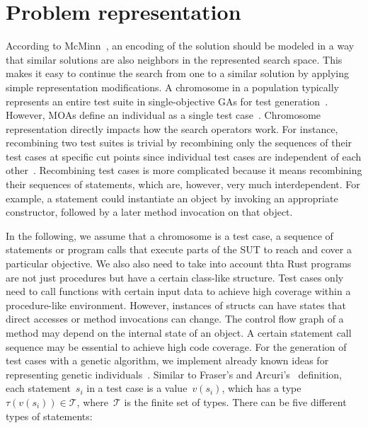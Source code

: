 \documentclass[paper=a4,%
  twoside,%
  BCOR4mm,%
  abstract=true,%
  toc=bibliography,%
  chapterprefix=true,%
  toc=bibliographynumbered,%
  open=right,%
  english,%
  pagesize=pdftex]{scrreprt}
\begin{document}
\section{Problem representation}
\label{sec:problem-representation}
According to McMinn~\cite{McMinn_2004}, an encoding of the solution should be modeled in a way that similar solutions are also neighbors in the represented search space. This makes it easy to continue the search from one to a similar solution by applying simple representation modifications. A chromosome in a population typically represents an entire test suite in single-objective \acp{GA} for test generation~\cite{Fraser_2011a, Campos2017}. However, \acp{MOA} define an individual as a single test case~\cite{Panichella2018}. Chromosome representation directly impacts how the search operators work. For instance, recombining two test suites is trivial by recombining only the sequences of their test cases at specific cut points since individual test cases are independent of each other~\cite{Fraser_2013}. Recombining test cases is more complicated because it means recombining their sequences of statements, which are, however, very much interdependent. For example, a statement could instantiate an object by invoking an appropriate constructor, followed by a later method invocation on that object. 

In the following, we assume that a chromosome is a test case, a sequence of statements or program calls that execute parts of the \ac{SUT} to reach and cover a particular objective. We also also need to take into account thta Rust programs are not just procedures but have a certain class-like structure. Test cases only need to call functions with certain input data to achieve high coverage within a procedure-like environment. However, instances of structs can have states that direct accesses or method invocations can change. The control flow graph of a method may depend on the internal state of an object. A certain statement call sequence may be essential to achieve high code coverage. For the generation of test cases with a genetic algorithm, we implement already known ideas for representing genetic individuals~\cite{Fraser2012,Tonella2004,Arcuri2008}. Similar to Fraser's and Arcuri's~\cite{Fraser_2011a} definition, each statement~$s_i$ in a test case is a value~$v(s_i)$, which has a type~$\tau(v(s_i)) \in \mathcal{T}$, where~$\mathcal{T}$ is the finite set of types. There can be five different types of statements:
\end{document}
